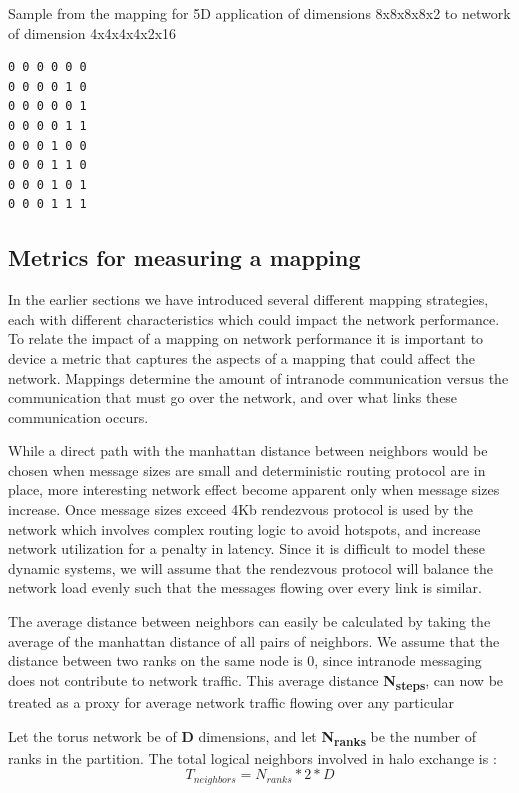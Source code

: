 \documentclass{acm_proc_article-sp}
\begin{document}
Sample from the mapping for 5D application of dimensions 8x8x8x8x2 to network of dimension 4x4x4x4x2x16
\begin{lstlisting}
0 0 0 0 0 0
0 0 0 0 1 0
0 0 0 0 0 1
0 0 0 0 1 1
0 0 0 1 0 0
0 0 0 1 1 0
0 0 0 1 0 1
0 0 0 1 1 1
\end{lstlisting}

\subsection{Metrics for measuring a mapping}

In the earlier sections we have introduced several different mapping strategies, each with different characteristics which could
impact the network performance. To relate the impact of a mapping on network performance it is important to device a metric that
captures the aspects of a mapping that could affect the network. Mappings determine the amount of intranode communication versus
the communication that must go over the network, and over what links these communication occurs.

While a direct path with the manhattan distance between neighbors would be chosen when message sizes are small and deterministic routing
protocol are in place, more interesting network effect become apparent only when message sizes increase. Once message sizes exceed 4Kb
rendezvous protocol is used by the network which involves complex routing logic to avoid hotspots, and increase network utilization for
a penalty in latency. Since it is difficult to model these dynamic systems, we will assume that the rendezvous protocol will balance
the network load evenly such that the messages flowing over every link is similar.


The average distance between neighbors can easily be calculated by taking the average of the manhattan distance of all pairs of neighbors.
We assume that the distance between two ranks on the same node is 0, since intranode messaging does not contribute to network traffic.
This average distance \textbf{N\textsubscript{steps}}, can now be treated as a proxy for average network traffic flowing over any particular 



Let the torus network be of \textbf{D} dimensions, and let \textbf{N\textsubscript{ranks}} be the number of ranks in the partition.
The total logical neighbors involved in halo exchange is :
\begin{equation}
  T_{neighbors} = N_{ranks} * 2 * D
\end{equation}
\end{document}
